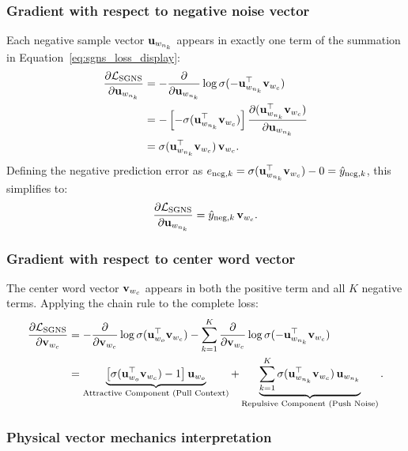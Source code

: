 \documentclass[../../../main.tex]{subfiles}
\begin{document}
\subsubsection{Gradient with respect to negative noise vector}
Each negative sample vector $\mathbf{u}_{w_{n_k}}$ appears in exactly one term of the summation in Equation~\eqref{eq:sgns_loss_display}:
\begin{align}
\frac{\partial \mathcal{L}_{\text{SGNS}}}{\partial \mathbf{u}_{w_{n_k}}} &= -\frac{\partial}{\partial \mathbf{u}_{w_{n_k}}} \log \sigma(-\mathbf{u}_{w_{n_k}}^\top \mathbf{v}_{w_c}) \notag \\
&= -\left[ -\sigma(\mathbf{u}_{w_{n_k}}^\top \mathbf{v}_{w_c}) \right] \frac{\partial (\mathbf{u}_{w_{n_k}}^\top \mathbf{v}_{w_c})}{\partial \mathbf{u}_{w_{n_k}}} \notag \\
\label{eq:grad_u_neg}
&= \sigma(\mathbf{u}_{w_{n_k}}^\top \mathbf{v}_{w_c}) \, \mathbf{v}_{w_c}.
\end{align}
Defining the negative prediction error as $e_{\text{neg}, k} = \sigma(\mathbf{u}_{w_{n_k}}^\top \mathbf{v}_{w_c}) - 0 = \hat{y}_{\text{neg}, k}$, this simplifies to:
\begin{equation}
\label{eq:grad_u_neg_clean}
\frac{\partial \mathcal{L}_{\text{SGNS}}}{\partial \mathbf{u}_{w_{n_k}}} = \hat{y}_{\text{neg}, k} \, \mathbf{v}_{w_c}.
\end{equation}

\subsubsection{Gradient with respect to center word vector}
The center word vector $\mathbf{v}_{w_c}$ appears in both the positive term and all $K$ negative terms. Applying the chain rule to the complete loss:
\begin{align}
\frac{\partial \mathcal{L}_{\text{SGNS}}}{\partial \mathbf{v}_{w_c}} &= -\frac{\partial}{\partial \mathbf{v}_{w_c}} \log \sigma(\mathbf{u}_{w_o}^\top \mathbf{v}_{w_c}) - \sum_{k=1}^K \frac{\partial}{\partial \mathbf{v}_{w_c}} \log \sigma(-\mathbf{u}_{w_{n_k}}^\top \mathbf{v}_{w_c}) \notag \\
\label{eq:grad_v_center}
&= \underbrace{\left[ \sigma(\mathbf{u}_{w_o}^\top \mathbf{v}_{w_c}) - 1 \right] \mathbf{u}_{w_o}}_{\text{Attractive Component (Pull Context)}} + \underbrace{\sum_{k=1}^K \sigma(\mathbf{u}_{w_{n_k}}^\top \mathbf{v}_{w_c}) \, \mathbf{u}_{w_{n_k}}}_{\text{Repulsive Component (Push Noise)}}.
\end{align}

\subsubsection{Physical vector mechanics interpretation}
\label{subsec:vector_mechanics}
\end{document}
